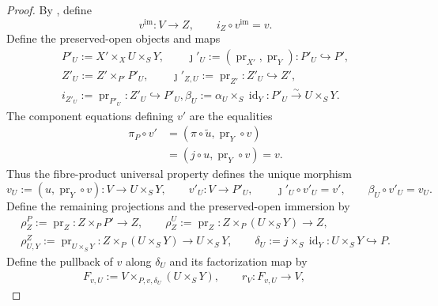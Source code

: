 \begin{proof}
  By , define
  \[
    v^{\mathrm{im}}\colon V\to Z,
    \qquad
    i_Z\circ v^{\mathrm{im}}=v.                                  \tag{SI3}
  \]
  Define the preserved-open objects and maps
  \[
  \begin{gathered}
    P'_U:=X'\times_XU\times_SY,
    \qquad
    \jmath'_U:=(\operatorname{pr}_{X'},\operatorname{pr}_Y)
      \colon P'_U\hookrightarrow P',\\
    Z'_U:=Z'\times_{P'}P'_U,
    \qquad
    \jmath'_{Z,U}:=\operatorname{pr}_{Z'}\colon Z'_U\hookrightarrow Z',\\
    i_{Z'_U}:=\operatorname{pr}_{P'_U}\colon
      Z'_U\hookrightarrow P'_U,
    \beta_U:=\alpha_U\times_S\operatorname{id}_Y
      \colon P'_U\xrightarrow{\sim}U\times_SY.
  \end{gathered}                                                   \tag{SI4}
  \]
  The component equations defining $v'$ are the equalities
  \[
  \begin{aligned}
    \pi_P\circ v'
      &=(\pi\circ\widetilde u,\operatorname{pr}_Y\circ v)\\
      &=(j\circ u,\operatorname{pr}_Y\circ v)=v.
  \end{aligned}                                                    \tag{SI5}
  \]
  Thus the fibre-product universal property defines the unique morphism
  \[
    v_U:=(u,\operatorname{pr}_Y\circ v)\colon V\to U\times_SY,
    \qquad
    v'_U\colon V\to P'_U,
    \qquad
    \jmath'_U\circ v'_U=v',
    \qquad
    \beta_U\circ v'_U=v_U.                                      \tag{SI6}
  \]
  Define the remaining projections and the preserved-open immersion by
  \[
  \begin{gathered}
    \rho_Z^P:=\operatorname{pr}_Z\colon Z\times_PP'\to Z,
    \qquad
    \rho_Z^U:=\operatorname{pr}_Z\colon
      Z\times_P(U\times_SY)\to Z,\\
    \rho_{U,Y}^Z:=\operatorname{pr}_{U\times_SY}\colon
      Z\times_P(U\times_SY)\to U\times_SY,
    \qquad
    \delta_U:=j\times_S\operatorname{id}_Y\colon U\times_SY\hookrightarrow P.
  \end{gathered}                                                    \tag{SI7a}
  \]
  Define the pullback of $v$ along $\delta_U$ and its factorization map by
  \[
  \begin{gathered}
    F_{v,U}:=V\times_{P,v,\delta_U}(U\times_SY),\qquad
    r_V\colon F_{v,U}\to V,\qquad

\end{gathered}\]
\end{proof}
